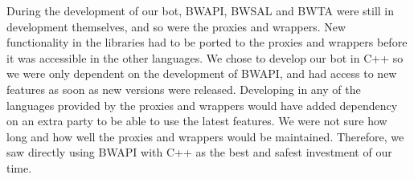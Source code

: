During the development of our bot, BWAPI, BWSAL and BWTA were still in development themselves, and so were the proxies and wrappers. New functionality in the libraries had to be ported to the proxies and wrappers before it was accessible in the other languages. We chose to develop our bot in C++ so we were only dependent on the development of BWAPI, and had access to new features as soon as new versions were released. Developing in any of the languages provided by the proxies and wrappers would have added dependency on an extra party to be able to use the latest features. We were not sure how long and how well the proxies and wrappers would be maintained. Therefore, we saw directly using BWAPI with C++ as the best and safest investment of our time.